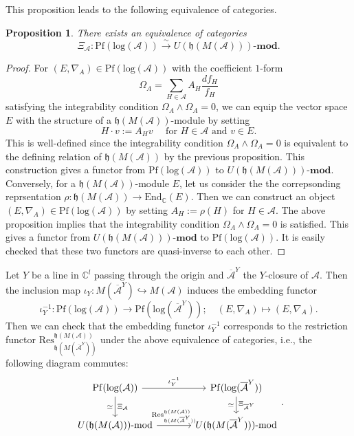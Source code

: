 \documentclass[a4paper,12pt]{article}
\newcommand{\C}{\mathbb{C}}
\newtheorem{prop}[thm]{Proposition}
\theoremstyle{definition}
\theoremstyle{remark}
\begin{document}
This proposition leads to the following equivalence of categories.
\begin{prop}\label{prop:equivPfmod}
	There exists an equivalence of categories
	\[
		\Xi_{\mathcal{A}}\colon \mathrm{Pf}(\mathrm{log}(\mathcal{A}))\xrightarrow{\sim} U(\mathfrak{h}(M(\mathcal{A})))\text{-}\mathbf{mod}.
	\]
\end{prop}
\begin{proof}
For $(E,\nabla_{A})\in \mathrm{Pf}(\mathrm{log}(\mathcal{A}))$
with the coefficient $1$-form
\[	\Omega_{A}=
	\sum_{H\in \mathcal{A}}A_{H}\frac{df_{H}}{f_{H}}
\]
satisfying the integrability condition $\Omega_{A}\wedge \Omega_{A}=0$, we can equip the vector space $E$ with the structure of a $\mathfrak{h}(M(\mathcal{A}))$-module by setting 
\[
	H\cdot v:=A_{H}v\quad \text{ for }H\in \mathcal{A}\text{ and }v\in E.
\]
This is well-defined since the integrability condition $\Omega_{A}\wedge \Omega_{A}=0$ is equivalent to the defining relation of $\mathfrak{h}(M(\mathcal{A}))$
by the previous proposition.
This construction gives a functor from $\mathrm{Pf}(\mathrm{log}(\mathcal{A}))$ to $U(\mathfrak{h}(M(\mathcal{A})))\text{-}\mathbf{mod}$.
Conversely, for a $\mathfrak{h}(M(\mathcal{A}))$-module $E$, let us consider the the correpsonding reprsentation $\rho \colon \mathfrak{h}(M(\mathcal{A})) \to \mathrm{End}_{\mathbb{C}}(E)$.
Then we can construct an object $(E,\nabla_{A})\in \mathrm{Pf}(\mathrm{log}(\mathcal{A}))$ by setting $A_{H}:=\rho(H)$ for 
$H\in \mathcal{A}$. The above proposition implies that the integrability condition $\Omega_{A}\wedge \Omega_{A}=0$ is satisfied.
This gives a functor from $U(\mathfrak{h}(M(\mathcal{A})))\text{-}\mathbf{mod}$ to $\mathrm{Pf}(\mathrm{log}(\mathcal{A}))$.
It is easily checked that these two functors are quasi-inverse to each other.
\end{proof}

Let $Y$ be a line in $\C^{l}$ passing through the origin and $\overline{\mathcal{A}}^{Y}$ the $Y$-closure of $\mathcal{A}$.
Then the inclusion map $\iota_{Y}\colon M(\overline{\mathcal{A}}^{Y})\hookrightarrow M(\mathcal{A})$ induces the embedding functor
\[
	\iota_{Y}^{-1}\colon \mathrm{Pf}(\mathrm{log}(\mathcal{A}))\to \mathrm{Pf}(\mathrm{log}(\overline{\mathcal{A}}^{Y}));\quad
	(E,\nabla_{A})\mapsto (E,\nabla_{A}).
\]
Then we can check that the embedding functor $\iota_{Y}^{-1}$ corresponds to the
restriction functor $\mathrm{Res}_{\mathfrak{h}(M(\overline{\mathcal{A}}^{Y}))}^{\mathfrak{h}(M(\mathcal{A}))}$
under the above equivalence of categories, i.e., the following diagram commutes:
\begin{equation}\label{eq:commPfmod}
\begin{tikzcd}[column sep=large]
\mathrm{Pf}(\mathrm{log}(\mathcal{A}))\arrow[r,"\iota_{Y}^{-1}"]\arrow[d,"\simeq"',"\Xi_{\mathcal{A}}"]&
\mathrm{Pf}(\mathrm{log}(\overline{\mathcal{A}}^{Y}))\arrow[d,"\simeq"', "\Xi_{\overline{\mathcal{A}}^{Y}}"]\\
U(\mathfrak{h}(M(\mathcal{A})))\text{-}\mathrm{mod}\arrow[r,"\mathrm{Res}_{\mathfrak{h}(M(\overline{\mathcal{A}}^{Y}))}^{\mathfrak{h}(M(\mathcal{A}))}"]&
U(\mathfrak{h}(M(\overline{\mathcal{A}}^{Y})))\text{-}\mathrm{mod}
\end{tikzcd}.
\end{equation}
\end{document}
